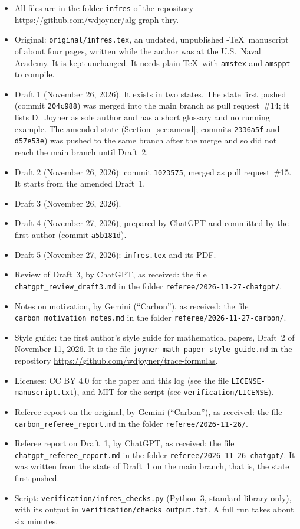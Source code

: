\documentclass[12pt,letterpaper]{article}
\begin{document}
\begin{itemize}[itemsep=1pt]
\item All files are in the folder \texttt{infres} of the repository
  \url{https://github.com/wdjoyner/alg-graph-thry}.
\item Original: \texttt{original/infres.tex}, an undated, unpublished
  \AmS-\TeX\ manuscript of about four pages, written while the author was
  at the U.S.\ Naval Academy. It is kept unchanged. It needs plain \TeX\
  with \texttt{amstex} and \texttt{amsppt} to compile.
\item Draft 1 (November 26, 2026). It exists in two states. The state
  first pushed (commit \texttt{204c988}) was merged into the main branch
  as pull request~\#14; it lists D.~Joyner as sole author and has a short
  glossary and no running example. The amended state
  (Section~\ref{sec:amend}; commits \texttt{2336a5f} and \texttt{d57e53e})
  was pushed to the same branch after the merge and so did not reach the
  main branch until Draft~2.
\item Draft 2 (November 26, 2026): commit \texttt{1023575}, merged as
  pull request~\#15. It starts from the amended Draft~1.
\item Draft 3 (November 26, 2026).
\item Draft 4 (November 27, 2026), prepared by ChatGPT and committed by
  the first author (commit \texttt{a5b181d}).
\item Draft 5 (November 27, 2026): \texttt{infres.tex} and its PDF.
\item Review of Draft~3, by ChatGPT, as received: the file
  \nolinkurl{chatgpt_review_draft3.md} in the folder
  \texttt{referee/2026-11-27-chatgpt/}.
\item Notes on motivation, by Gemini (``Carbon''), as received: the file
  \nolinkurl{carbon_motivation_notes.md} in the folder
  \texttt{referee/2026-11-27-carbon/}.
\item Style guide: the first author's style guide for mathematical
  papers, Draft~2 of November 11, 2026. It is the file
  \nolinkurl{joyner-math-paper-style-guide.md} in the repository
  \url{https://github.com/wdjoyner/trace-formulas}.
\item Licenses: CC BY 4.0 for the paper and this log (see the file
  \nolinkurl{LICENSE-manuscript.txt}), and MIT for the script (see
  \nolinkurl{verification/LICENSE}).
\item Referee report on the original, by Gemini (``Carbon''), as
  received: the file \nolinkurl{carbon_referee_report.md} in the folder
  \texttt{referee/2026-11-26/}.
\item Referee report on Draft~1, by ChatGPT, as received: the file
  \nolinkurl{chatgpt_referee_report.md} in the folder
  \texttt{referee/2026-11-26-chatgpt/}. It was written from the state of
  Draft~1 on the main branch, that is, the state first pushed.
\item Script: \texttt{verification/infres\_checks.py} (Python~3, standard
  library only), with its output in
  \texttt{verification/checks\_output.txt}. A full run takes about six
  minutes.
\end{itemize}
\end{document}
